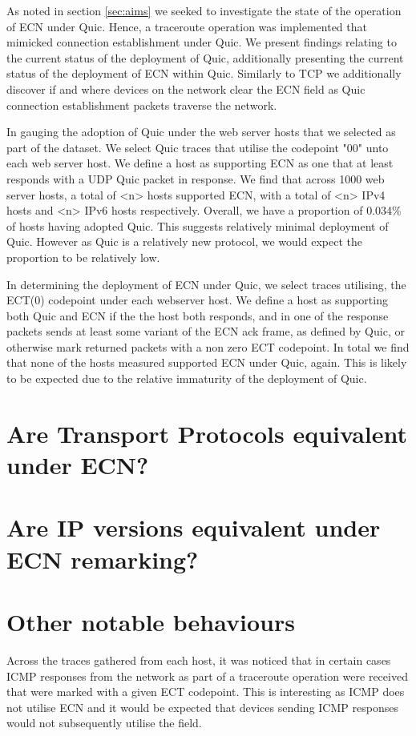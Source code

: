\documentclass{l4proj}
\begin{document}
As noted in section \ref{sec:aims} we seeked to investigate the state of the operation of ECN under Quic. Hence, a traceroute operation was implemented that mimicked connection establishment under Quic. We present findings relating to the current status of the deployment of Quic, additionally presenting the current status of the deployment of ECN within Quic. Similarly to TCP we additionally discover if and where devices on the network clear the ECN field as Quic connection establishment packets traverse the network.

In gauging the adoption of Quic under the web server hosts that we selected as part of the dataset. We select Quic traces that utilise the codepoint "00" unto each web server host. We define a host as supporting ECN as one that at least responds with a UDP Quic packet in response. We find that across 1000 web server hosts, a total of <n> hosts supported ECN, with a total of <n> IPv4 hosts and <n> IPv6 hosts respectively. Overall, we have a proportion of 0.034\% of hosts having adopted Quic. This suggests relatively minimal deployment of Quic. However as Quic is a relatively new protocol, we would expect the proportion to be relatively low.

In determining the deployment of ECN under Quic, we select traces utilising, the ECT(0) codepoint under each webserver host. We define a host as supporting both Quic and ECN if the the host both responds, and in one of the response packets sends at least some variant of the ECN ack frame, as defined by Quic, or otherwise mark returned packets with a non zero ECT codepoint. In total we find that none of the hosts measured supported ECN under Quic, again. This is likely to be expected due to the relative immaturity of the deployment of Quic.


\section{Are Transport Protocols equivalent under ECN?}

\section{Are IP versions equivalent under ECN remarking?}


\section{Other notable behaviours}

Across the traces gathered from each host, it was noticed that in certain cases ICMP responses from the network as part of a traceroute operation were received that were marked with a given ECT codepoint. This is interesting as ICMP does not utilise ECN and it would be expected that devices sending ICMP responses would not subsequently utilise the field.
\end{document}
